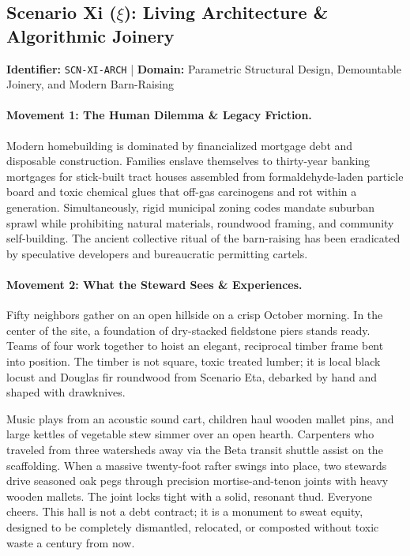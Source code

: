 \subsection{Scenario Xi (\texorpdfstring{$\xi$}{Xi}): Living Architecture \& Algorithmic Joinery}
\label{subsec:scn_xi}
\textbf{Identifier:} \texttt{SCN-XI-ARCH} \quad | \quad \textbf{Domain:} Parametric Structural Design, Demountable Joinery, and Modern Barn-Raising

\paragraph{Movement 1: The Human Dilemma \& Legacy Friction.}
Modern homebuilding is dominated by financialized mortgage debt and disposable construction. Families enslave themselves to thirty-year banking mortgages for stick-built tract houses assembled from formaldehyde-laden particle board and toxic chemical glues that off-gas carcinogens and rot within a generation. Simultaneously, rigid municipal zoning codes mandate suburban sprawl while prohibiting natural materials, roundwood framing, and community self-building. The ancient collective ritual of the barn-raising has been eradicated by speculative developers and bureaucratic permitting cartels.

\paragraph{Movement 2: What the Steward Sees \& Experiences.}
Fifty neighbors gather on an open hillside on a crisp October morning. In the center of the site, a foundation of dry-stacked fieldstone piers stands ready. Teams of four work together to hoist an elegant, reciprocal timber frame bent into position. The timber is not square, toxic treated lumber; it is local black locust and Douglas fir roundwood from Scenario Eta, debarked by hand and shaped with drawknives. 

Music plays from an acoustic sound cart, children haul wooden mallet pins, and large kettles of vegetable stew simmer over an open hearth. Carpenters who traveled from three watersheds away via the Beta transit shuttle assist on the scaffolding. When a massive twenty-foot rafter swings into place, two stewards drive seasoned oak pegs through precision mortise-and-tenon joints with heavy wooden mallets. The joint locks tight with a solid, resonant thud. Everyone cheers. This hall is not a debt contract; it is a monument to sweat equity, designed to be completely dismantled, relocated, or composted without toxic waste a century from now.

